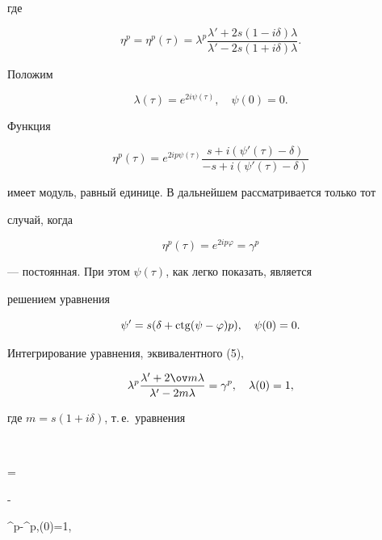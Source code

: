 где 


$$ 


\eta^p=\eta^p(\tau)=\lambda^p 


\frac{\lambda'+2s(1-i\delta)\lambda}{\lambda'-2s(1+i\delta)\lambda}. 


$$ 


 


Положим 


$$ 


\lambda(\tau)=e^{2i\psi(\tau)},\quad \psi(0)=0. 


$$ 


Функция 


$$ 


\eta^p(\tau)=e^{2ip\psi(\tau)} 


\frac{s+i(\psi'(\tau)-\delta)}{-s+i(\psi'(\tau)-\delta)} 


$$ 


имеет модуль, равный единице. В дальнейшем рассматривается только тот 


случай, когда 


$$ 


\eta^p(\tau)=e^{2ip\varphi}=\gamma^p 


$$ 


--- постоянная. При этом $\psi(\tau)$, как легко показать, является 


решением уравнения 


\begin{equation} 


\psi'=s(\delta+\ctg(\psi-\varphi)p),\quad 


\psi(0)=0. 


\end{equation} 


 


Интегрирование уравнения, эквивалентного (5), 


$$ 


\lambda^p\frac{\lambda'+2\ov m\lambda}{\lambda'-2m\lambda}= 


\gamma^p,\quad \lambda(0)=1, 


$$ 


где $m=s(1+i\delta)$, т.\,е.~уравнения 


$$ 


= 


- 


{\lambda^p-\gamma^p},\quad \lambda(0)=1, 


